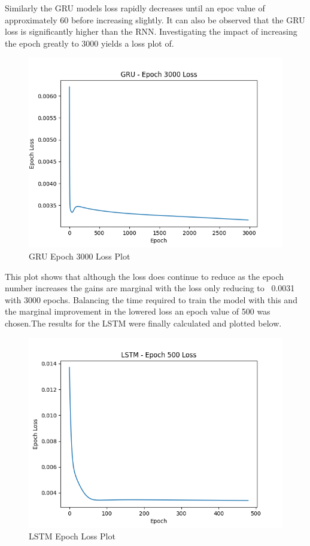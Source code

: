 \documentclass[10pt,twocolumn,letterpaper]{article}
\newcommand{\squeezeup}{\vspace{-10.0mm}}
\begin{document}
Similarly the GRU models loss rapidly decreases until an epoc value of approximately 60
before increasing slightly. It can also be observed that the GRU loss is significantly 
higher than the RNN. Investigating the impact of increasing the epoch greatly to 3000 yields 
a loss plot of.
\begin{center}
   \begin{figure}[H]
   \includegraphics[scale=0.5]{GRU-Epoch3000_loss.png}
   \caption{GRU Epoch 3000 Loss Plot}
   \end{figure}
 \end{center}
This plot shows that although the loss does continue to reduce as the epoch number increases 
the gains are marginal with the loss only reducing to ~0.0031 with 3000 epochs. Balancing 
the time required to train the model with this and the marginal improvement in the lowered 
loss an epoch value of 500 was chosen.The results for the LSTM 
were finally calculated and plotted below. 
\begin{center}
   \begin{figure}[H]
   \includegraphics[scale=0.5]{LSTM-Epoch500_loss.png}
   \caption{LSTM Epoch Loss Plot }
   \end{figure}
 \end{center}
 \squeezeup
\end{document}
